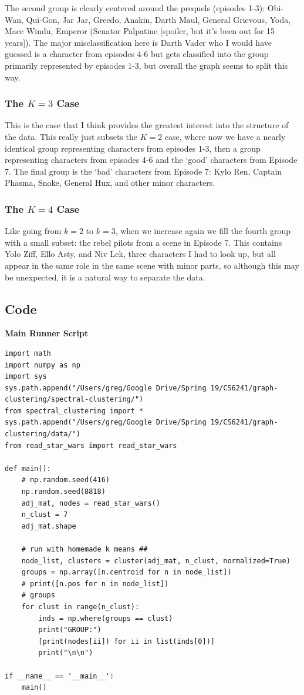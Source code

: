 \documentclass[12pt]{article} \usepackage[utf8]{inputenc}
\begin{document}
The second group is clearly centered around the prequels (episodes 1-3): Obi-Wan, Qui-Gon, Jar Jar, Greedo, Anakin, Darth Maul, General Grievous, Yoda, Mace Windu, Emperor (Senator Palpatine [spoiler, but it's been out for 15 years]). The major misclassification here is Darth Vader who I would have guessed is a character from episodes 4-6 but gets classified into the group primarily represented by episodes 1-3, but overall the graph seems to split this way.

\subsubsection*{The $K=3$ Case}

This is the case that I think provides the greatest interest into the structure of the data. This really just subsets the $K=2$ case, where now we have a nearly identical group representing characters from episodes 1-3, then a group representing characters from episodes 4-6 and the `good' characters from Episode 7.
The final group is the `bad' characters from Episode 7: Kylo Ren, Captain Phasma, Snoke, General Hux, and other minor characters.


\subsubsection*{The $K=4$ Case}

Like going from $k=2$ to $k=3$, when we increase again we fill the fourth group with a small subset: the rebel pilots from a scene in Episode 7. This contains Yolo Ziff, Ello Asty, and Niv Lek, three characters I had to look up, but all appear in the same role in the same scene with minor parts, so although this may be unexpected, it is a natural way to separate the data.


\subsection*{Code}
\lstset{language=Python}
\footnotesize
\textbf{Main Runner Script}
\begin{lstlisting}
import math
import numpy as np
import sys
sys.path.append("/Users/greg/Google Drive/Spring 19/CS6241/graph-clustering/spectral-clustering/")
from spectral_clustering import *
sys.path.append("/Users/greg/Google Drive/Spring 19/CS6241/graph-clustering/data/")
from read_star_wars import read_star_wars

def main():
    # np.random.seed(416)
    np.random.seed(8818)
    adj_mat, nodes = read_star_wars()
    n_clust = 7
    adj_mat.shape

    # run with homemade k means ##
    node_list, clusters = cluster(adj_mat, n_clust, normalized=True)
    groups = np.array([n.centroid for n in node_list])
    # print([n.pos for n in node_list])
    # groups
    for clust in range(n_clust):
        inds = np.where(groups == clust)
        print("GROUP:")
        [print(nodes[ii]) for ii in list(inds[0])]
        print("\n\n")

if __name__ == '__main__':
    main()
\end{lstlisting}
\end{document}
